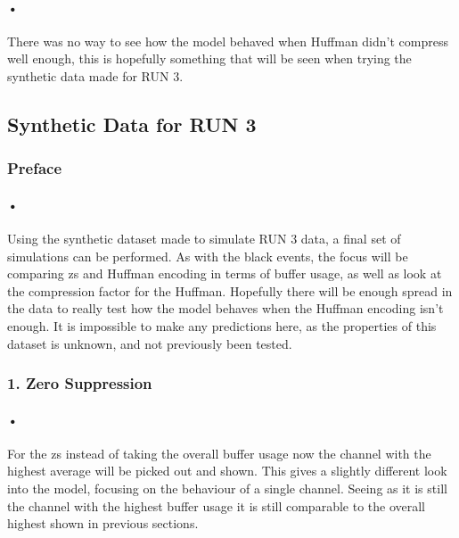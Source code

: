 \documentclass[a4paper, 12pt]{report}
\begin{document}
\paragraph{•}
There was no way to see how the model behaved when Huffman didn't compress well enough, this is hopefully something that will be seen when trying the synthetic data made for RUN 3.


\subsection{Synthetic Data for RUN 3}

\subsubsection{Preface}
\paragraph{•}
Using the synthetic dataset made to simulate RUN 3 data, a final set of simulations can be performed.
As with the black events, the focus will be comparing \gls{zs} and Huffman encoding in terms of buffer usage, as well as look at the compression factor for the Huffman.
Hopefully there will be enough spread in the data to really test how the model behaves when the Huffman encoding isn't enough.
It is impossible to make any predictions here, as the properties of this dataset is unknown, and not previously been tested.

\subsubsection{1. Zero Suppression}

\paragraph{•}
For the \gls{zs} instead of taking the overall buffer usage now the channel with the highest average will be picked out and shown.
This gives a slightly different look into the model, focusing on the behaviour of a single channel.
Seeing as it is still the channel with the highest buffer usage it is still comparable to the overall highest shown in previous sections. 
\end{document}
